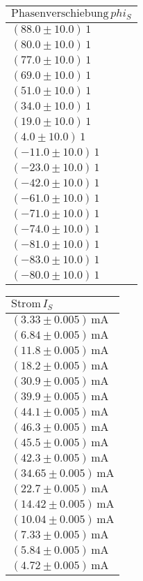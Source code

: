 \documentclass[a4paper,10pt]{scrbook}
\begin{document}
\begin{table}[htb]
\centering
\begin{tabular}{|l|}
\hline
$\text{Phasenverschiebung}\,phi_S$  \\ \hline
$(88.0\pm 10.0)\,\mathrm{1}$
\\ \hline
$(80.0\pm 10.0)\,\mathrm{1}$
\\ \hline
$(77.0\pm 10.0)\,\mathrm{1}$
\\ \hline
$(69.0\pm 10.0)\,\mathrm{1}$
\\ \hline
$(51.0\pm 10.0)\,\mathrm{1}$
\\ \hline
$(34.0\pm 10.0)\,\mathrm{1}$
\\ \hline
$(19.0\pm 10.0)\,\mathrm{1}$
\\ \hline
$(4.0\pm 10.0)\,\mathrm{1}$
\\ \hline
$(-11.0\pm 10.0)\,\mathrm{1}$
\\ \hline
$(-23.0\pm 10.0)\,\mathrm{1}$
\\ \hline
$(-42.0\pm 10.0)\,\mathrm{1}$
\\ \hline
$(-61.0\pm 10.0)\,\mathrm{1}$
\\ \hline
$(-71.0\pm 10.0)\,\mathrm{1}$
\\ \hline
$(-74.0\pm 10.0)\,\mathrm{1}$
\\ \hline
$(-81.0\pm 10.0)\,\mathrm{1}$
\\ \hline
$(-83.0\pm 10.0)\,\mathrm{1}$
\\ \hline
$(-80.0\pm 10.0)\,\mathrm{1}$
\\ \hline
\end{tabular}
\end{table}
\begin{table}[htb]
\centering
\begin{tabular}{|l|}
\hline
$\text{Strom}\,I_S$  \\ \hline
$(3.33\pm 0.005)\,\mathrm{mA}$
\\ \hline
$(6.84\pm 0.005)\,\mathrm{mA}$
\\ \hline
$(11.8\pm 0.005)\,\mathrm{mA}$
\\ \hline
$(18.2\pm 0.005)\,\mathrm{mA}$
\\ \hline
$(30.9\pm 0.005)\,\mathrm{mA}$
\\ \hline
$(39.9\pm 0.005)\,\mathrm{mA}$
\\ \hline
$(44.1\pm 0.005)\,\mathrm{mA}$
\\ \hline
$(46.3\pm 0.005)\,\mathrm{mA}$
\\ \hline
$(45.5\pm 0.005)\,\mathrm{mA}$
\\ \hline
$(42.3\pm 0.005)\,\mathrm{mA}$
\\ \hline
$(34.65\pm 0.005)\,\mathrm{mA}$
\\ \hline
$(22.7\pm 0.005)\,\mathrm{mA}$
\\ \hline
$(14.42\pm 0.005)\,\mathrm{mA}$
\\ \hline
$(10.04\pm 0.005)\,\mathrm{mA}$
\\ \hline
$(7.33\pm 0.005)\,\mathrm{mA}$
\\ \hline
$(5.84\pm 0.005)\,\mathrm{mA}$
\\ \hline
$(4.72\pm 0.005)\,\mathrm{mA}$
\\ \hline
\end{tabular}
\end{table}
\end{document}
